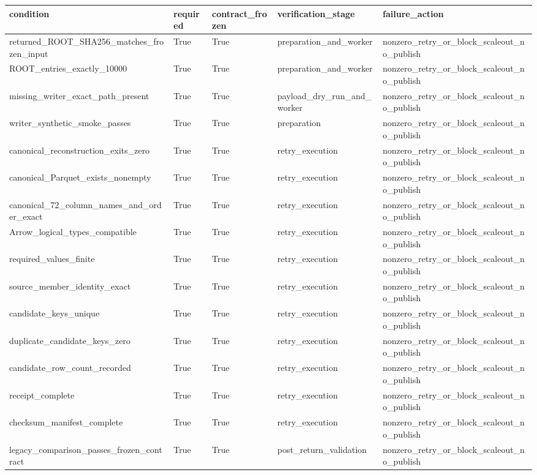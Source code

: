 \begin{tabular}{lllll}
\toprule
condition & required & contract\_frozen & verification\_stage & failure\_action \\
\midrule
returned\_ROOT\_SHA256\_matches\_frozen\_input & True & True & preparation\_and\_worker & nonzero\_retry\_or\_block\_scaleout\_no\_publish \\
ROOT\_entries\_exactly\_10000 & True & True & preparation\_and\_worker & nonzero\_retry\_or\_block\_scaleout\_no\_publish \\
missing\_writer\_exact\_path\_present & True & True & payload\_dry\_run\_and\_worker & nonzero\_retry\_or\_block\_scaleout\_no\_publish \\
writer\_synthetic\_smoke\_passes & True & True & preparation & nonzero\_retry\_or\_block\_scaleout\_no\_publish \\
canonical\_reconstruction\_exits\_zero & True & True & retry\_execution & nonzero\_retry\_or\_block\_scaleout\_no\_publish \\
canonical\_Parquet\_exists\_nonempty & True & True & retry\_execution & nonzero\_retry\_or\_block\_scaleout\_no\_publish \\
canonical\_72\_column\_names\_and\_order\_exact & True & True & retry\_execution & nonzero\_retry\_or\_block\_scaleout\_no\_publish \\
Arrow\_logical\_types\_compatible & True & True & retry\_execution & nonzero\_retry\_or\_block\_scaleout\_no\_publish \\
required\_values\_finite & True & True & retry\_execution & nonzero\_retry\_or\_block\_scaleout\_no\_publish \\
source\_member\_identity\_exact & True & True & retry\_execution & nonzero\_retry\_or\_block\_scaleout\_no\_publish \\
candidate\_keys\_unique & True & True & retry\_execution & nonzero\_retry\_or\_block\_scaleout\_no\_publish \\
duplicate\_candidate\_keys\_zero & True & True & retry\_execution & nonzero\_retry\_or\_block\_scaleout\_no\_publish \\
candidate\_row\_count\_recorded & True & True & retry\_execution & nonzero\_retry\_or\_block\_scaleout\_no\_publish \\
receipt\_complete & True & True & retry\_execution & nonzero\_retry\_or\_block\_scaleout\_no\_publish \\
checksum\_manifest\_complete & True & True & retry\_execution & nonzero\_retry\_or\_block\_scaleout\_no\_publish \\
legacy\_comparison\_passes\_frozen\_contract & True & True & post\_return\_validation & nonzero\_retry\_or\_block\_scaleout\_no\_publish \\
\bottomrule
\end{tabular}
